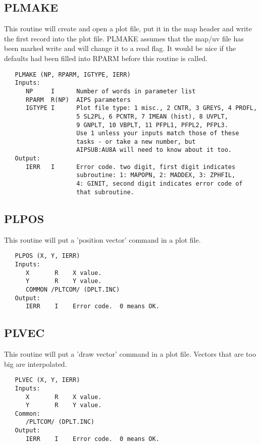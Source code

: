 \subsection{PLMAKE}
This routine will create and open a plot file, put it in the map
header and write the first record into the plot file.
PLMAKE assumes that the map/uv file has been marked write and will
change it to a read flag.  It would be nice if the defaults had
been filled into RPARM before this routine is called.
\begin{verbatim}
   PLMAKE (NP, RPARM, IGTYPE, IERR)
   Inputs:
      NP     I      Number of words in parameter list
      RPARM  R(NP)  AIPS parameters
      IGTYPE I      Plot file type: 1 misc., 2 CNTR, 3 GREYS, 4 PROFL,
                    5 SL2PL, 6 PCNTR, 7 IMEAN (hist), 8 UVPLT,
                    9 GNPLT, 10 VBPLT, 11 PFPL1, PFPL2, PFPL3.
                    Use 1 unless your inputs match those of these
                    tasks - or take a new number, but
                    AIPSUB:AU8A will need to know about it too.
   Output:
      IERR   I      Error code. two digit, first digit indicates
                    subroutine: 1: MAPOPN, 2: MADDEX, 3: ZPHFIL,
                    4: GINIT, second digit indicates error code of
                    that subroutine.

\end{verbatim}

\subsection{PLPOS}
This routine will put a 'position vector' command in a plot file.
\begin{verbatim}
   PLPOS (X, Y, IERR)
   Inputs:
      X       R    X value.
      Y       R    Y value.
      COMMON /PLTCOM/ (DPLT.INC)
   Output:
      IERR    I    Error code.  0 means OK.

\end{verbatim}

\subsection{PLVEC}
This routine will put a 'draw vector' command in a plot file.
Vectors that are too big are interpolated.
\begin{verbatim}
   PLVEC (X, Y, IERR)
   Inputs:
      X       R    X value.
      Y       R    Y value.
   Common:
      /PLTCOM/ (DPLT.INC)
   Output:
      IERR    I    Error code.  0 means OK.

\end{verbatim}

